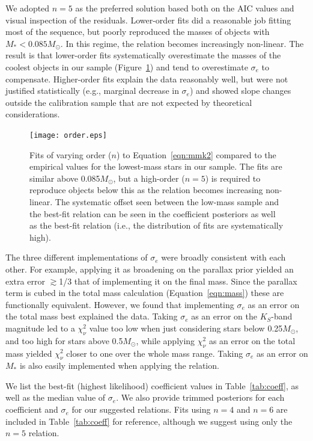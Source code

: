 \documentclass[twocolumn]{aastex62}
\newcommand{\order}{5}
\begin{document}
We adopted $n=\order$ as the preferred solution based both on the AIC values and visual inspection of the residuals. Lower-order fits did a reasonable job fitting most of the sequence, but poorly reproduced the masses of objects with $M_*<0.085M_\odot$. In this regime, the relation becomes increasingly non-linear. The result is that lower-order fits systematically overestimate the masses of the coolest objects in our sample (Figure~\ref{fig:order}) and tend to overestimate $\sigma_e$ to compensate. Higher-order fits explain the data reasonably well, but were not justified statistically (e.g., marginal decrease in $\sigma_e$) and showed slope changes outside the calibration sample that are not expected by theoretical considerations. 

\begin{figure}[h]
\begin{center}
\texttt{[image: order.eps]}
\caption{Fits of varying order ($n$) to Equation~\ref{eqn:mmk2} compared to the empirical values for the lowest-mass stars in our sample. The fits are similar above 0.085$M_\odot$, but a high-order ($n=\order$) is required to reproduce objects below this as the relation becomes increasing non-linear. The systematic offset seen between the low-mass sample and the best-fit relation can be seen in the coefficient posteriors as well as the best-fit relation (i.e., the distribution of fits are systematically high). }
\label{fig:order}
\end{center}
\end{figure}

The three different implementations of $\sigma_e$ were broadly consistent with each other. For example, applying it as broadening on the parallax prior yielded an extra error $\gtrsim$1/3 that of implementing it on the final mass. Since the parallax term is cubed in the total mass calculation (Equation~\ref{eqn:mass}) these are functionally equivalent. However, we found that implementing $\sigma_e$ as an error on the total mass best explained the data. Taking $\sigma_e$ as an error on the $K_S$-band magnitude led to a $\chi^2_\nu$ value too low when just considering stars below 0.25$M_\odot$, and too high for stars above 0.5$M_\odot$, while applying $\chi^2_\nu$ as an error on the total mass yielded $\chi^2_\nu$ closer to one over the whole mass range. Taking $\sigma_e$ as an error on $M_*$ is also easily implemented when applying the relation. 

We list the best-fit (highest likelihood) coefficient values in Table~\ref{tab:coeff}, as well as the median value of $\sigma_e$. We also provide trimmed posteriors for each coefficient and $\sigma_e$ for our suggested relations. Fits using $n=4$ and $n=6$ are included in Table~\ref{tab:coeff} for reference, although we suggest using only the $n=\order$ relation. 
\end{document}
